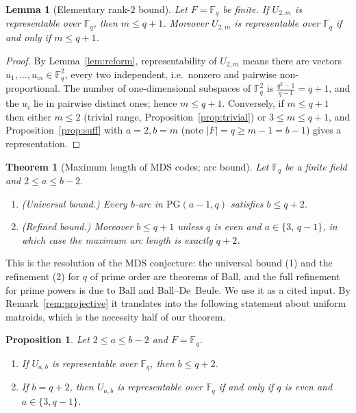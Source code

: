 \documentclass{amsart}
\newtheorem{theorem}{Theorem}
\newtheorem{lemma}{Lemma}
\newtheorem{proposition}{Proposition}
\theoremstyle{definition}
\begin{document}
\begin{lemma}[Elementary rank-$2$ bound]\label{lem:rank2}
Let $F=\mathbb F_q$ be finite. If $U_{2,m}$ is representable over $\mathbb F_q$,
then $m\le q+1$. Moreover $U_{2,m}$ is representable over $\mathbb F_q$ if and
only if $m\le q+1$.
\end{lemma}

\begin{proof}
By Lemma~\ref{lem:reform}, representability of $U_{2,m}$ means there are vectors
$u_1,\dots,u_m\in\mathbb F_q^{2}$, every two independent, i.e.\ nonzero and
pairwise non-proportional. The number of one-dimensional subspaces of
$\mathbb F_q^2$ is $\tfrac{q^2-1}{q-1}=q+1$, and the $u_i$ lie in pairwise
distinct ones; hence $m\le q+1$. Conversely, if $m\le q+1$ then either $m\le2$
(trivial range, Proposition~\ref{prop:trivial}) or $3\le m\le q+1$, and
Proposition~\ref{prop:suff} with $a=2,b=m$ (note $|F|=q\ge m-1=b-1$) gives a
representation.
\end{proof}

\begin{theorem}[Maximum length of MDS codes; arc bound]\label{thm:mds}
Let $\mathbb F_q$ be a finite field and $2\le a\le b-2$.
\begin{enumerate}
\item \emph{(Universal bound.)} Every $b$-arc in $\mathrm{PG}(a-1,q)$ satisfies
$b\le q+2$.
\item \emph{(Refined bound.)} Moreover $b\le q+1$ unless $q$ is even and
$a\in\{3,\,q-1\}$, in which case the maximum arc length is exactly $q+2$.
\end{enumerate}
\end{theorem}

This is the resolution of the MDS conjecture: the universal bound (1) and the
refinement (2) for $q$ of prime order are theorems of Ball, and the full
refinement for prime powers is due to Ball and Ball--De~Beule. We use it as a
cited input. By Remark~\ref{rem:projective} it translates into the following
statement about uniform matroids, which is the necessity half of our theorem.

\begin{proposition}\label{prop:nec}
Let $2\le a\le b-2$ and $F=\mathbb F_q$.
\begin{enumerate}
\item If $U_{a,b}$ is representable over $\mathbb F_q$, then $b\le q+2$.
\item If $b=q+2$, then $U_{a,b}$ is representable over $\mathbb F_q$ if and only
if $q$ is even and $a\in\{3,q-1\}$.
\end{enumerate}
\end{proposition}
\end{document}
